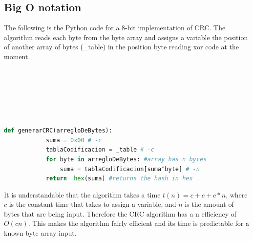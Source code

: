 \documentclass[10pt,twocolumn,letterpaper]{article}
\begin{document}
\subsection{Big O notation}
The following is the Python code for a 8-bit implementation of CRC. The algorithm reads each byte from the byte array and assigns a variable the position of another array of bytes (\_table) in the position  byte reading xor code at the moment.\\ \\ \\ \\ \\ \\ \\
\begin{lstlisting}[language=Python]
		def generarCRC(arregloDeBytes):
			suma = 0x00 # -c
			tablaCodificacion = _table # -c
			for byte in arregloDeBytes: #array has n bytes
				suma = tablaCodificacion[suma^byte] # -n
			return  hex(suma) #returns the hash in hex
	\end{lstlisting}
	It is understandable that the algorithm takes a time $t(n) = c+c+c*n$, where $c$ is the constant time that takes to assign a variable, and $n$ is the amount of bytes that are being input. Therefore the CRC algorithm has a n efficiency of $O(cn)$. This makes the algorithm fairly efficient and its time is predictable for a known byte array input.
\end{document}
